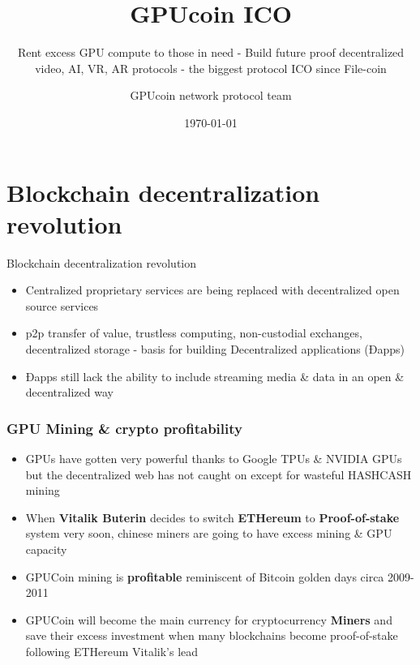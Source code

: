 \documentclass[10pt]{beamer}
\title{ GPUcoin ICO }
\subtitle{Rent excess GPU compute to those in need - Build future proof decentralized video, AI, VR, AR protocols - the biggest protocol ICO since File-coin}
\date{\today}
\author{GPUcoin network protocol team}
\institute{\href{http://gpuco.in}{GPUcoin Foundation}}
\begin{document}
\maketitle


\section{Blockchain decentralization revolution}
\begin{frame}[fragile]{Blockchain decentralization revolution}
 \begin{itemize}[<+-| alert@+>]%
 
\item Centralized proprietary services are being replaced with decentralized open source services
\item p2p transfer of value, trustless computing, non-custodial exchanges, decentralized storage - basis for building Decentralized applications (Ðapps)
 \item Ðapps still lack the ability to include streaming media \& data in an open \& decentralized way
\end{itemize}

\end{frame}

\begin{frame}[t]\frametitle{GPU Mining \& crypto profitability}
 
\begin{itemize}[<+-| alert@+>]
\item GPUs have gotten very powerful thanks to Google TPUs \& NVIDIA GPUs but the decentralized web has not caught on except for wasteful HASHCASH mining
\item When \textbf{Vitalik Buterin} decides to switch \textbf{ETHereum} to \textbf{Proof-of-stake} system very soon, chinese miners are going to have excess mining \& GPU capacity
\item GPUCoin mining is \textbf{profitable} reminiscent of Bitcoin golden days circa 2009-2011
\item GPUCoin will become the main currency for cryptocurrency \textbf{Miners} and save their excess investment when many blockchains become proof-of-stake following ETHereum Vitalik's lead
\end{itemize}

\end{frame}
\end{document}
